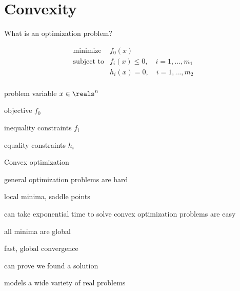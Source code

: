 \documentclass[presentation]{beamer}
\newcommand{\figures}{./figures}
\begin{document}
%
%
%
%
%
%
%

%
%

\section{Convexity}

\begin{frame}{What is an optimization problem?}

\[
\begin{array}{ll}
\mbox{minimize}  & f_0(x) \\
\mbox{subject to} & f_i(x) \leq 0, \quad i=1, \ldots, m_1\\
& h_i(x) = 0, \quad i=1, \ldots, m_2\\
\end{array}
\]

\bit
\item problem variable $x \in \reals^n$
\item objective $f_0$
\item inequality constraints $f_i$
\item equality constraints $h_i$
\eit

\end{frame}

\begin{frame}{Convex optimization}

general optimization problems are hard
\bit
\item local minima, saddle points
\item can take exponential time to solve
\eit
\vfill
convex optimization problems are easy
\bit
\item all minima are global
\item fast, global convergence
\item can prove we found a solution
\item models a wide variety of real problems
\eit

\end{frame}
\end{document}
